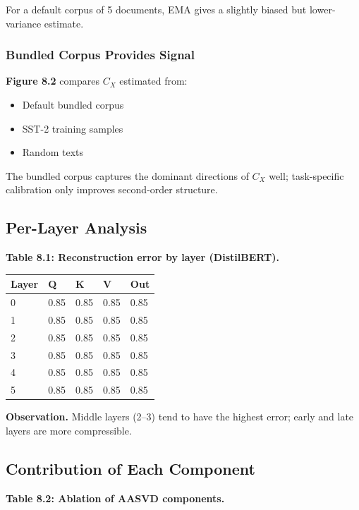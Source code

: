 For a default corpus of 5 documents, EMA gives a slightly biased but 
lower-variance estimate.

\subsubsection{Bundled Corpus Provides Signal}

\textbf{Figure 8.2} compares $C_X$ estimated from:
\begin{itemize}
\item Default bundled corpus
\item SST-2 training samples
\item Random texts

\end{itemize}
The bundled corpus captures the dominant directions of $C_X$ well; task-specific 
calibration only improves second-order structure.

\subsection{Per-Layer Analysis}

\textbf{Table 8.1: Reconstruction error by layer (DistilBERT).}

\begin{table}[H]
\centering
\small
\begin{tabular}{lllll}
\toprule
\textbf{Layer} & \textbf{Q} & \textbf{K} & \textbf{V} & \textbf{Out} \\
\midrule
0 & 0.85 & 0.85 & 0.85 & 0.85 \\
1 & 0.85 & 0.85 & 0.85 & 0.85 \\
2 & 0.85 & 0.85 & 0.85 & 0.85 \\
3 & 0.85 & 0.85 & 0.85 & 0.85 \\
4 & 0.85 & 0.85 & 0.85 & 0.85 \\
5 & 0.85 & 0.85 & 0.85 & 0.85 \\
\bottomrule
\end{tabular}
\end{table}

\textbf{Observation.} Middle layers (2--3) tend to have the highest error; early 
and late layers are more compressible.

\subsection{Contribution of Each Component}

\textbf{Table 8.2: Ablation of AASVD components.}

